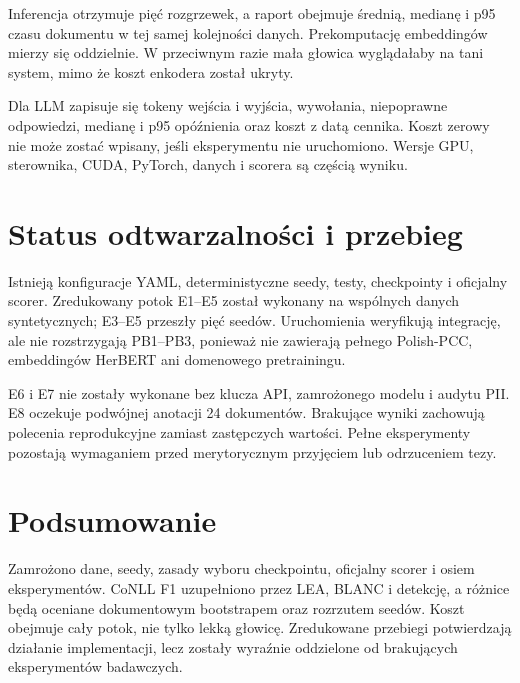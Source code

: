 Inferencja otrzymuje pięć rozgrzewek, a raport obejmuje średnią, medianę i p95 czasu dokumentu w tej samej kolejności danych. Prekomputację embeddingów mierzy się oddzielnie. W przeciwnym razie mała głowica wyglądałaby na tani system, mimo że koszt enkodera został ukryty.

Dla LLM zapisuje się tokeny wejścia i wyjścia, wywołania, niepoprawne odpowiedzi, medianę i p95 opóźnienia oraz koszt z datą cennika. Koszt zerowy nie może zostać wpisany, jeśli eksperymentu nie uruchomiono. Wersje GPU, sterownika, CUDA, PyTorch, danych i scorera są częścią wyniku.

\section{Status odtwarzalności i przebieg}
\label{sec:status-eksperymentow}

Istnieją konfiguracje YAML, deterministyczne seedy, testy, checkpointy i oficjalny scorer. Zredukowany potok E1--E5 został wykonany na wspólnych danych syntetycznych; E3--E5 przeszły pięć seedów. Uruchomienia weryfikują integrację, ale nie rozstrzygają PB1--PB3, ponieważ nie zawierają pełnego Polish-PCC, embeddingów HerBERT ani domenowego pretrainingu.

E6 i E7 nie zostały wykonane bez klucza API, zamrożonego modelu i audytu PII. E8 oczekuje podwójnej anotacji 24 dokumentów. Brakujące wyniki zachowują polecenia reprodukcyjne zamiast zastępczych wartości. Pełne eksperymenty pozostają wymaganiem przed merytorycznym przyjęciem lub odrzuceniem tezy.

\section{Podsumowanie}

Zamrożono dane, seedy, zasady wyboru checkpointu, oficjalny scorer i osiem eksperymentów. CoNLL F1 uzupełniono przez LEA, BLANC i detekcję, a różnice będą oceniane dokumentowym bootstrapem oraz rozrzutem seedów. Koszt obejmuje cały potok, nie tylko lekką głowicę. Zredukowane przebiegi potwierdzają działanie implementacji, lecz zostały wyraźnie oddzielone od brakujących eksperymentów badawczych.

